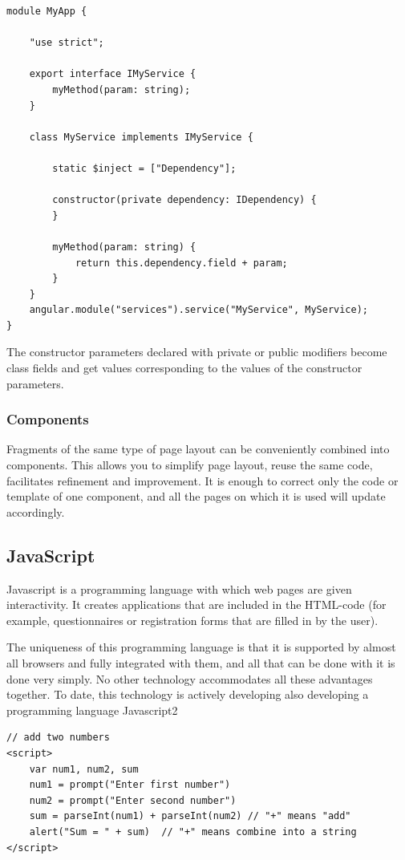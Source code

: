 \begin{verbatim}
module MyApp {

    "use strict";

    export interface IMyService {
        myMethod(param: string);
    }

    class MyService implements IMyService {

        static $inject = ["Dependency"];

        constructor(private dependency: IDependency) {
        }

        myMethod(param: string) {
            return this.dependency.field + param;
        }
    }
    angular.module("services").service("MyService", MyService);
}
\end{verbatim}

The constructor parameters declared with private or public modifiers become class fields and get values corresponding to the values of the constructor parameters.

\subsubsection{Components}
Fragments of the same type of page layout can be conveniently combined into components. This allows you to simplify page layout, reuse the same code, facilitates refinement and improvement. It is enough to correct only the code or template of one component, and all the pages on which it is used will update accordingly.\cite{Typescript}


\subsection{JavaScript}
Javascript is a programming language with which web pages are given interactivity. It creates applications that are included in the HTML-code (for example, questionnaires or registration forms that are filled in by the user).\par The uniqueness of this programming language is that it is supported by almost all browsers and fully integrated with them, and all that can be done with it is done very simply. No other technology accommodates all these advantages together. To date, this technology is actively developing also developing a programming language Javascript2 \cite{JavaScript}

\begin{verbatim}
// add two numbers
<script>
    var num1, num2, sum
    num1 = prompt("Enter first number")
    num2 = prompt("Enter second number")
    sum = parseInt(num1) + parseInt(num2) // "+" means "add"
    alert("Sum = " + sum)  // "+" means combine into a string
</script>
\end{verbatim}
\cite{JavaScriptCode}

